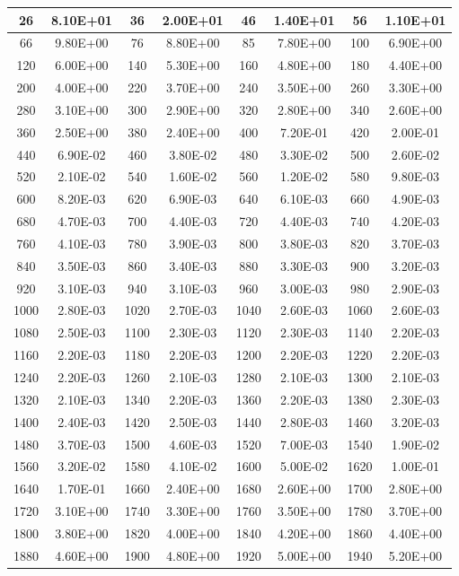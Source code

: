 \documentclass[dvipsnames, svgnames,a4paper,11pt]{article}
\begin{document}
\begin{longtable}{|c|c|c|c|c|c|c|c|}
		26 & 8.10E+01 & 36 & 2.00E+01 & 46 & 1.40E+01 & 56 & 1.10E+01 \\ 
		\hline
		66 & 9.80E+00 & 76 & 8.80E+00 & 85 & 7.80E+00 & 100 & 6.90E+00 \\ 
		\hline
		120 & 6.00E+00 & 140 & 5.30E+00 & 160 & 4.80E+00 & 180 & 4.40E+00 \\ 
		\hline
		200 & 4.00E+00 & 220 & 3.70E+00 & 240 & 3.50E+00 & 260 & 3.30E+00 \\ 
		\hline
		280 & 3.10E+00 & 300 & 2.90E+00 & 320 & 2.80E+00 & 340 & 2.60E+00 \\ 
		\hline
		360 & 2.50E+00 & 380 & 2.40E+00 & 400 & 7.20E-01 & 420 & 2.00E-01 \\ 
		\hline
		440 & 6.90E-02 & 460 & 3.80E-02 & 480 & 3.30E-02 & 500 & 2.60E-02 \\ 
		\hline
		520 & 2.10E-02 & 540 & 1.60E-02 & 560 & 1.20E-02 & 580 & 9.80E-03 \\ 
		\hline
		600 & 8.20E-03 & 620 & 6.90E-03 & 640 & 6.10E-03 & 660 & 4.90E-03 \\ 
		\hline
		680 & 4.70E-03 & 700 & 4.40E-03 & 720 & 4.40E-03 & 740 & 4.20E-03 \\ 
		\hline
		760 & 4.10E-03 & 780 & 3.90E-03 & 800 & 3.80E-03 & 820 & 3.70E-03 \\ 
		\hline
		840 & 3.50E-03 & 860 & 3.40E-03 & 880 & 3.30E-03 & 900 & 3.20E-03 \\ 
		\hline
		920 & 3.10E-03 & 940 & 3.10E-03 & 960 & 3.00E-03 & 980 & 2.90E-03 \\ 
		\hline
		1000 & 2.80E-03 & 1020 & 2.70E-03 & 1040 & 2.60E-03 & 1060 & 2.60E-03 \\ 
		\hline
		1080 & 2.50E-03 & 1100 & 2.30E-03 & 1120 & 2.30E-03 & 1140 & 2.20E-03 \\ 
		\hline
		1160 & 2.20E-03 & 1180 & 2.20E-03 & 1200 & 2.20E-03 & 1220 & 2.20E-03 \\ 
		\hline
		1240 & 2.20E-03 & 1260 & 2.10E-03 & 1280 & 2.10E-03 & 1300 & 2.10E-03 \\ 
		\hline
		1320 & 2.10E-03 & 1340 & 2.20E-03 & 1360 & 2.20E-03 & 1380 & 2.30E-03 \\ 
		\hline
		1400 & 2.40E-03 & 1420 & 2.50E-03 & 1440 & 2.80E-03 & 1460 & 3.20E-03 \\ 
		\hline
		1480 & 3.70E-03 & 1500 & 4.60E-03 & 1520 & 7.00E-03 & 1540 & 1.90E-02 \\ 
		\hline
		1560 & 3.20E-02 & 1580 & 4.10E-02 & 1600 & 5.00E-02 & 1620 & 1.00E-01 \\ 
		\hline
		1640 & 1.70E-01 & 1660 & 2.40E+00 & 1680 & 2.60E+00 & 1700 & 2.80E+00 \\ 
		\hline
		1720 & 3.10E+00 & 1740 & 3.30E+00 & 1760 & 3.50E+00 & 1780 & 3.70E+00 \\ 
		\hline
		1800 & 3.80E+00 & 1820 & 4.00E+00 & 1840 & 4.20E+00 & 1860 & 4.40E+00 \\ 
		\hline
		1880 & 4.60E+00 & 1900 & 4.80E+00 & 1920 & 5.00E+00 & 1940 & 5.20E+00 \\ 
		\hline
	
		\end{longtable}
		
\end{document}
